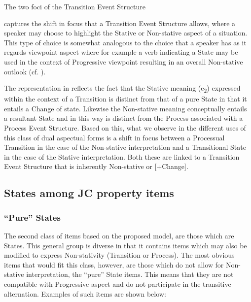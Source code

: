  
\ea%
 \label{ex:5:13} 
 The two foci of the Transition Event Structure
 \begin{center}
\end{center}

\z 
{} captures the shift in focus that a Transition Event Structure allows, where a speaker may choose to highlight the Stative or Non-stative aspect of a situation. This type of choice is somewhat analogous to the choice that a speaker has as it regards viewpoint aspect where for example a verb indicating a State may be used in the context of Progressive viewpoint resulting in an overall Non-stative outlook (cf. \citealt{Smith1983}). 

The representation in  reflects the fact that the Stative meaning (e\textsubscript{2}) expressed within the context of a Transition is distinct from that of a pure State in that it entails a Change of state. Likewise the Non-stative meaning conceptually entails a resultant State and in this way is distinct from the Process associated with a Process Event Structure. Based on this, what we observe in the different uses of this class of dual aspectual forms is a shift in focus between a Processual Transition in the case of the Non-stative interpretation and a Transitional State in the case of the Stative interpretation. Both these are linked to a Transition Event Structure that is inherently Non-stative or [+Change]. 


\subsection{States among JC property items}\label{sec:5.2.2}
\subsubsection{“Pure'' States}\label{sec:5.2.2.1}
The second class of items based on the proposed model, are those which are States. This general group is diverse in that it contains items which may also be modified to express Non-stativity (Transition or Process). The most obvious items that would fit this class, however, are those which do not allow for Non-stative interpretation, the ``pure'' State items. This means that they are not compatible with Progressive aspect and do not participate in the transitive alternation. Examples of such items are shown below: 

